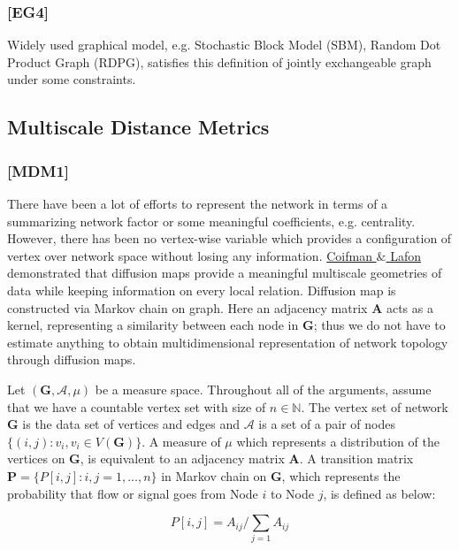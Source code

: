 \documentclass[12pt]{article}
\theoremstyle{definition}
\begin{document}
\subsubsection{[EG4]}


Widely used graphical model, e.g. Stochastic Block Model (SBM), Random Dot Product Graph (RDPG), satisfies this definition of jointly exchangeable graph under some constraints. 



\subsection{Multiscale Distance Metrics}


\subsubsection{[MDM1]}


There have been a lot of efforts to represent the network in terms of a summarizing network factor\cite{Hoff} or some meaningful coefficients, e.g. centrality\cite{centrality1}\cite{centrality2}. However, there has been no vertex-wise variable which provides a configuration of vertex over network space without losing any information. \hyperlink{Coifman}{Coifman $\&$ Lafon}\cite{Coifman} demonstrated that diffusion maps provide a meaningful multiscale geometries of data while keeping information on every local relation. Diffusion map is constructed via Markov chain on graph. Here an adjacency matrix $\boldsymbol{A}$ acts as a kernel, representing a similarity between each node in $\boldsymbol{G}$; thus we do not have to estimate anything to obtain multidimensional representation of network topology through diffusion maps. 

Let $(\boldsymbol{G}, \mathcal{A}, \mu)$ be a measure space. Throughout all of the arguments, assume that we have a countable vertex set with size of $n \in \mathbb{N}$. The vertex set of network $\boldsymbol{G}$ is the data set of vertices and edges and $\mathcal{A}$ is a set of a pair of nodes $\{(i,j) : v_{i}, v_{i} \in V(\boldsymbol{G}) \}$. A measure of $\mu$ which represents a distribution of the vertices on $\boldsymbol{G}$, is equivalent to an adjacency matrix $\boldsymbol{A}$. A transition matrix $\mathbf{P} = \{P[i,j] : i,j=1,...,n \}$ in Markov chain on $\boldsymbol{G}$, which represents the probability that flow or signal goes from Node $i$ to Node $j$, is defined as below:

\begin{equation}
P[i,j] = A_{ij} \big/ \sum\limits_{j=1} A_{ij}
\end{equation}
\end{document}
